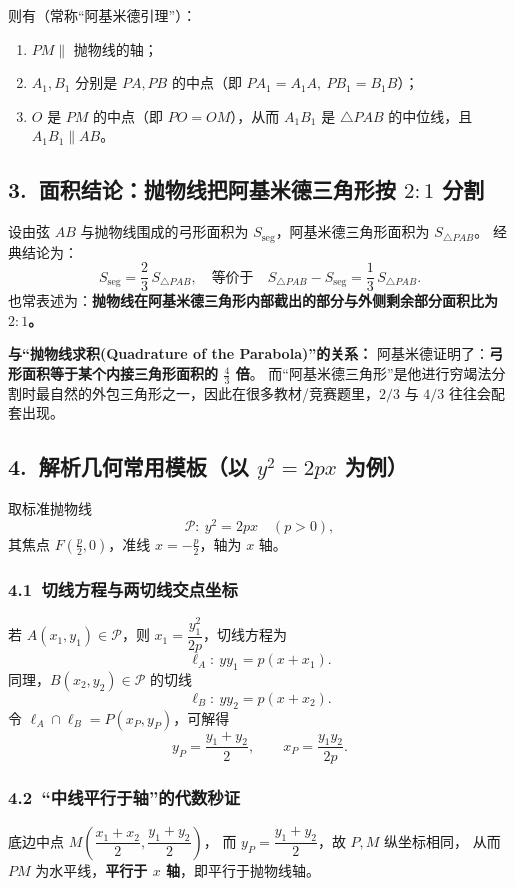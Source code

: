 \documentclass{ctexart}
\begin{document}
	则有（常称“阿基米德引理”）：
	\begin{enumerate}
		\item $PM \parallel$ 抛物线的轴；
		\item $A_1,B_1$ 分别是 $PA,PB$ 的中点（即 $PA_1=A_1A,\ PB_1=B_1B$）；
		\item $O$ 是 $PM$ 的中点（即 $PO=OM$），从而 $A_1B_1$ 是 $\triangle PAB$ 的中位线，且 $A_1B_1 \parallel AB$。
	\end{enumerate}
	
	\subsection*{3.\ 面积结论：抛物线把阿基米德三角形按 $2:1$ 分割}
	设由弦 $AB$ 与抛物线围成的弓形面积为 $S_{\text{seg}}$，阿基米德三角形面积为 $S_{\triangle PAB}$。
	经典结论为：
	\[
	S_{\text{seg}}=\frac{2}{3}\,S_{\triangle PAB},
	\quad\text{等价于}\quad
	S_{\triangle PAB}-S_{\text{seg}}=\frac{1}{3}\,S_{\triangle PAB}.
	\]
	也常表述为：\textbf{抛物线在阿基米德三角形内部截出的部分与外侧剩余部分面积比为 $2:1$。}
	
	\textbf{与“抛物线求积(Quadrature of the Parabola)”的关系：}
	阿基米德证明了：\textbf{弓形面积等于某个内接三角形面积的 $\frac{4}{3}$ 倍}。
	而“阿基米德三角形”是他进行穷竭法分割时最自然的外包三角形之一，因此在很多教材/竞赛题里，$2/3$ 与 $4/3$ 往往会配套出现。
	
	\subsection*{4.\ 解析几何常用模板（以 $y^2=2px$ 为例）}
	取标准抛物线
	\[
	\mathcal P:\ y^2=2px\quad(p>0),
	\]
	其焦点 $F\left(\frac p2,0\right)$，准线 $x=-\frac p2$，轴为 $x$ 轴。
	
	\subsubsection*{4.1\ 切线方程与两切线交点坐标}
	若 $A(x_1,y_1)\in\mathcal P$，则 $x_1=\dfrac{y_1^2}{2p}$，切线方程为
	\[
	\ell_A:\ yy_1=p(x+x_1).
	\]
	同理，$B(x_2,y_2)\in\mathcal P$ 的切线
	\[
	\ell_B:\ yy_2=p(x+x_2).
	\]
	令 $\ell_A\cap\ell_B=P(x_P,y_P)$，可解得
	\[
	y_P=\frac{y_1+y_2}{2},\qquad
	x_P=\frac{y_1y_2}{2p}.
	\]
	
	\subsubsection*{4.2\ “中线平行于轴”的代数秒证}
	底边中点 $M\!\left(\dfrac{x_1+x_2}{2},\dfrac{y_1+y_2}{2}\right)$，
	而 $y_P=\dfrac{y_1+y_2}{2}$，故 $P,M$ 纵坐标相同，
	从而 $PM$ 为水平线，\textbf{平行于 $x$ 轴}，即平行于抛物线轴。
	
\end{document}
